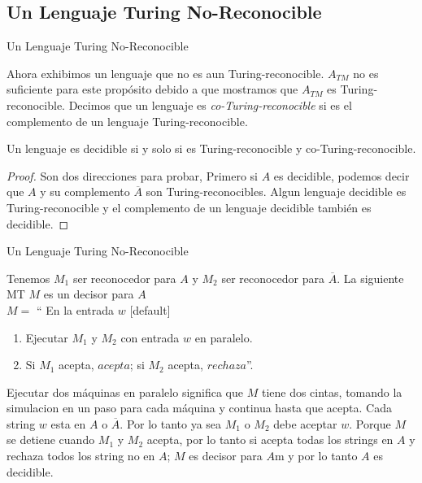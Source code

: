 \documentclass[11pt]{beamer}
\begin{document}
	\subsection{Un Lenguaje Turing No-Reconocible}
	    \begin{frame}{Un Lenguaje Turing No-Reconocible}
			\justifying
			
			\begin{definition}
               Ahora exhibimos un lenguaje que no es aun Turing-reconocible. $A_{TM}$ no es suficiente para este propósito debido a que mostramos que $A_{TM}$ es Turing-reconocible. Decimos que un lenguaje es \textit{co-Turing-reconocible} si es el complemento de un lenguaje Turing-reconocible.
            \end{definition}
			
			\begin{theorem}
                Un lenguaje es decidible si y solo si es Turing-reconocible y co-Turing-reconocible.
            \end{theorem}
			
			\begin{proof}
                Son dos direcciones para probar, Primero si $A$ es decidible, podemos decir que $A$ y su complemento $\overline{A}$ son Turing-reconocibles. Algun lenguaje decidible es Turing-reconocible y el complemento de un lenguaje decidible también es decidible.
            \end{proof}
			
		\end{frame}
		
		\begin{frame}{Un Lenguaje Turing No-Reconocible}
			\justifying
			
			Tenemos $M_1$ ser reconocedor para $A$ y $M_2$ ser reconocedor para $\overline{A}$. La siguiente MT $M$ es un decisor para $A$\\
			$M=$ `` En la entrada $w$
		    \begin{enumerate}
		        \item Ejecutar $M_1$ y $M_2$ con entrada $w$ en paralelo.
		        \item Si $M_1$ acepta, $acepta$; si $M_2$ acepta, $rechaza$''.
		    \end{enumerate}
			
			Ejecutar dos máquinas en paralelo significa que $M$ tiene dos cintas, tomando la simulacion en un paso para cada máquina y continua hasta que acepta. Cada string $w$ esta en $A$ o $\overline{A}$. Por lo tanto ya sea $M_1$ o $M_2$ debe aceptar $w$. Porque $M$ se detiene cuando $M_1$ y $M_2$ acepta, por lo tanto si acepta todas los strings en $A$ y rechaza todos los string no en $A$; $M$ es decisor para $A$m y por lo tanto $A$ es decidible.
			
		\end{frame}
		
\end{document}
